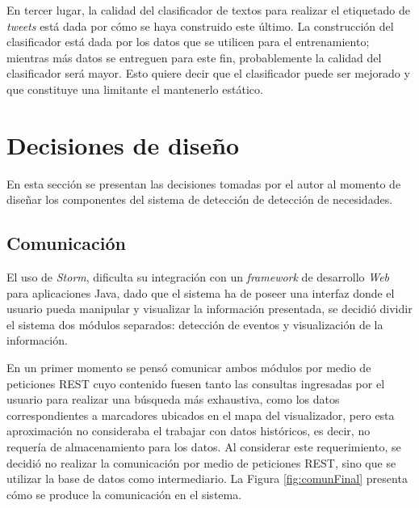 En tercer lugar, la calidad del clasificador de textos para realizar el etiquetado de \textit{tweets} está dada por cómo se haya construido este último. La construcción del clasificador está dada por los datos que se utilicen para el entrenamiento; mientras más datos se entreguen para este fin, probablemente la calidad del clasificador será mayor. Esto quiere decir que el clasificador puede ser mejorado y que constituye una limitante el mantenerlo estático.

\section{Decisiones de diseño}
\label{sec:decDiseno}

En esta sección se presentan las decisiones tomadas por el autor al momento de diseñar los componentes del sistema de detección de detección de necesidades.

\subsection{Comunicación}
\label{sec:diseno:comunicacion}

El uso de \textit{Storm}, dificulta su integración con un \textit{framework} de desarrollo \textit{Web} para aplicaciones Java, dado que el sistema ha de poseer una interfaz donde el usuario pueda manipular y visualizar la información presentada, se decidió dividir el sistema dos módulos separados: detección de eventos y visualización de la información.

En un primer momento se pensó comunicar ambos módulos por medio de peticiones REST cuyo contenido fuesen tanto las consultas ingresadas por el usuario para realizar una búsqueda más exhaustiva, como los datos correspondientes a marcadores ubicados en el mapa del visualizador, pero esta aproximación no consideraba el trabajar con datos históricos, es decir, no requería de almacenamiento para los datos. Al considerar este requerimiento, se decidió no realizar la comunicación por medio de peticiones REST, sino que se utilizar la base de datos como intermediario. La Figura \ref{fig:comunFinal} presenta cómo se produce la comunicación en el sistema.

